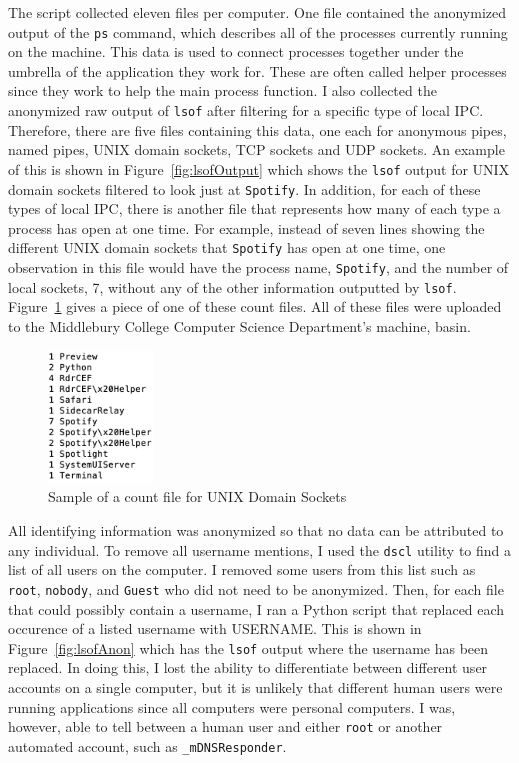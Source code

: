 The script collected eleven files per computer.  One file contained the anonymized output of the \texttt{ps} command, which describes all of the processes currently running on the machine.  This data is used to connect processes together under the umbrella of the application they work for.  These are often called helper processes since they work to help the main process function.  I also collected the anonymized raw output of \texttt{lsof} after filtering for a specific type of local IPC.  Therefore, there are five files containing this data, one each for anonymous pipes, named pipes, UNIX domain sockets, TCP sockets and UDP sockets.  An example of this is shown in Figure~\ref{fig:lsofOutput} which shows the \texttt{lsof} output for UNIX domain sockets filtered to look just at \texttt{Spotify}.  In addition, for each of these types of local IPC, there is another file that represents how many of each type a process has open at one time.  For example, instead of seven lines showing the different UNIX domain sockets that \texttt{Spotify} has open at one time, one observation in this file would have the process name, \texttt{Spotify}, and the number of local sockets, 7, without any of the other information outputted by \texttt{lsof}.  Figure~\ref{fig:countOutput} gives a piece of one of these count files.  All of these files were uploaded to the Middlebury College Computer Science Department's machine, basin.

\begin{figure}
\centering
\includegraphics[width=0.25\textwidth]{countOutput.png}
\caption{Sample of a count file for UNIX Domain Sockets}
\label{fig:countOutput}
\end{figure}

All identifying information was anonymized so that no data can be attributed to any individual.  To remove all username mentions, I used the \texttt{dscl} utility to find a list of all users on the computer.  I removed some users from this list such as \texttt{root}, \texttt{nobody}, and \texttt{Guest} who did not need to be anonymized.  Then, for each file that could possibly contain a username, I ran a Python script that replaced each occurence of a listed username with USERNAME.  This is shown in Figure~\ref{fig:lsofAnon} which has the \texttt{lsof} output where the username has been replaced.  In doing this, I lost the ability to differentiate between different user accounts on a single computer, but it is unlikely that different human users were running applications since all computers were personal computers.  I was, however, able to tell between a human user and either \texttt{root} or another automated account, such as \texttt{\_mDNSResponder}.

